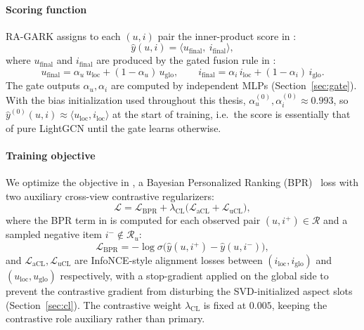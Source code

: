 \paragraph{Scoring function} RA-GARK assigns to each $(u, i)$ pair the inner-product score in :
\begin{equation}
\label{eq:score}
\hat{y}(u, i) = \langle u_{\mathrm{final}},\ i_{\mathrm{final}} \rangle,
\end{equation}
where $u_{\mathrm{final}}$ and $i_{\mathrm{final}}$ are produced by the gated fusion rule in :
\begin{equation}
\label{eq:fusion}
u_{\mathrm{final}} = \alpha_u\, u_{\mathrm{loc}} + (1 - \alpha_u)\, u_{\mathrm{glo}}, \qquad
i_{\mathrm{final}} = \alpha_i\, i_{\mathrm{loc}} + (1 - \alpha_i)\, i_{\mathrm{glo}}.
\end{equation}
The gate outputs $\alpha_u, \alpha_i$ are computed by independent MLPs (Section~\ref{sec:gate}). With the bias initialization used throughout this thesis, $\alpha_u^{(0)}, \alpha_i^{(0)} \approx 0.993$, so $\hat{y}^{(0)}(u, i) \approx \langle u_{\mathrm{loc}}, i_{\mathrm{loc}} \rangle$ at the start of training, i.e.\ the score is essentially that of pure LightGCN until the gate learns otherwise.

\paragraph{Training objective} We optimize the objective in , a Bayesian Personalized Ranking (BPR)~\cite{rendle2009bpr} loss with two auxiliary cross-view contrastive regularizers:
\begin{equation}
\label{eq:total-loss}
\mathcal{L} = \mathcal{L}_{\mathrm{BPR}} + \lambda_{\mathrm{CL}} \bigl( \mathcal{L}_{\mathrm{aCL}} + \mathcal{L}_{\mathrm{uCL}} \bigr),
\end{equation}
where the BPR term in  is computed for each observed pair $(u, i^+) \in \mathcal{R}$ and a sampled negative item $i^- \notin \mathcal{R}_u$:
\begin{equation}
\label{eq:bpr}
\mathcal{L}_{\mathrm{BPR}} = - \log \sigma\bigl( \hat{y}(u, i^+) - \hat{y}(u, i^-) \bigr),
\end{equation}
and $\mathcal{L}_{\mathrm{aCL}}, \mathcal{L}_{\mathrm{uCL}}$ are InfoNCE-style alignment losses between $(i_{\mathrm{loc}}, i_{\mathrm{glo}})$ and $(u_{\mathrm{loc}}, u_{\mathrm{glo}})$ respectively, with a stop-gradient applied on the global side to prevent the contrastive gradient from disturbing the SVD-initialized aspect slots (Section~\ref{sec:cl}). The contrastive weight $\lambda_{\mathrm{CL}}$ is fixed at $0.005$, keeping the contrastive role auxiliary rather than primary.

